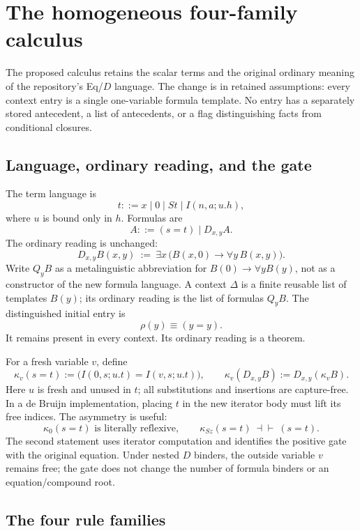 \section{The homogeneous four-family calculus}
\label{sec:homogeneous}

The proposed calculus retains the scalar terms and the original ordinary
meaning of the repository's Eq/$D$ language.  The change is in retained
assumptions: every context entry is a single one-variable formula
template.  No entry has a separately stored antecedent, a list of
antecedents, or a flag distinguishing facts from conditional closures.

\subsection{Language, ordinary reading, and the gate}

The term language is
\[
 t ::= x\mid 0\mid St\mid I(n,a;u.h),
\]
where $u$ is bound only in $h$.  Formulas are
\[
 A ::= (s=t)\mid D_{x,y}A.
\]
The ordinary reading is unchanged:
\[
 D_{x,y}B(x,y)\ :=\ \exists x\,
             \bigl(B(x,0)\to\forall y\,B(x,y)\bigr).
\]
Write $Q_yB$ as a metalinguistic abbreviation for
$B(0)\to\forall yB(y)$, not as a constructor of the new formula language.
A context $\Delta$ is a finite reusable list of templates $B(y)$; its
ordinary reading is the list of formulas $Q_yB$.  The distinguished
initial entry is
\[
 \rho(y)\equiv(y=y).
\]
It remains present in every context.  Its ordinary reading is a theorem.

For a fresh variable $v$, define
\[
 \kappa_v(s=t)
   :=\bigl(I(0,s;u.t)=I(v,s;u.t)\bigr),
 \qquad
 \kappa_v(D_{x,y}B):=D_{x,y}(\kappa_vB).
\]
Here $u$ is fresh and unused in $t$; all substitutions and insertions are
capture-free.  In a de Bruijn implementation, placing $t$ in the new
iterator body must lift its free indices.  The asymmetry is useful:
\[
 \kappa_0(s=t)\text{ is literally reflexive},\qquad
 \kappa_{Sz}(s=t)\ \dashv\vdash\ (s=t).
\]
The second statement uses iterator computation and identifies the
positive gate with the original equation.  Under nested
$D$ binders, the outside variable $v$ remains free; the gate does not
change the number of formula binders or an equation/compound root.

\subsection{The four rule families}

